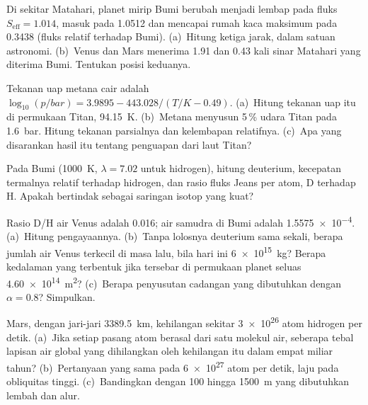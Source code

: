 \begin{exercise}[$\star$]\label{exo:b3:planetary-atmospheres:3}
Di sekitar Matahari, planet mirip Bumi berubah menjadi lembap pada fluks $S_\mathrm{eff}
= 1.014$, masuk  pada 1.0512 dan mencapai rumah kaca maksimum pada 0.3438
(fluks relatif terhadap Bumi). (a)~Hitung ketiga jarak, dalam
satuan astronomi. (b)~Venus dan Mars menerima 1.91 dan 0.43 kali
sinar Matahari yang diterima Bumi. Tentukan posisi keduanya.
\end{exercise}

\begin{exercise}[$\star$]\label{exo:b3:planetary-atmospheres:4}
Tekanan uap metana cair adalah $\log_{10}(p/\unit{bar}) = 3.9895 -
443.028/(T/\unit{K} - 0.49)$. (a)~Hitung tekanan uap itu di permukaan Titan,
\qty{94.15}{K}. (b)~Metana menyusun 5\,\% udara Titan pada \qty{1.6}{bar}.
Hitung tekanan parsialnya dan kelembapan relatifnya. (c)~Apa yang
disarankan hasil itu tentang penguapan dari laut Titan?
\end{exercise}

\begin{exercise}[$\star\star$]\label{exo:b3:planetary-atmospheres:5}
Pada  Bumi (\qty{1000}{K}, $\lambda = 7.02$ untuk hidrogen),
hitung  deuterium, kecepatan termalnya relatif terhadap
hidrogen, dan rasio fluks Jeans per atom, D terhadap H. Apakah 
bertindak sebagai saringan isotop yang kuat?
\end{exercise}

\begin{exercise}[$\star\star$]\label{exo:b3:planetary-atmospheres:6}
Rasio D/H air Venus adalah \num{0.016}; air samudra di
Bumi adalah \num{1.5575e-4}. (a)~Hitung pengayaannya. (b)~Tanpa
lolosnya deuterium sama sekali, berapa jumlah air Venus terkecil di masa lalu,
bila hari ini \qty{6e15}{kg}? Berapa kedalaman yang terbentuk jika tersebar di
permukaan planet seluas \qty{4.60e14}{m^2}? (c)~Berapa penyusutan cadangan
yang dibutuhkan  dengan $\alpha = 0.8$? Simpulkan.
\end{exercise}

\begin{exercise}[$\star\star$]\label{exo:b3:planetary-atmospheres:7}
Mars, dengan jari-jari \qty{3389.5}{km}, kehilangan sekitar \num{3e26} atom hidrogen
per detik. (a)~Jika setiap pasang atom berasal dari satu molekul air, seberapa
tebal lapisan air global yang dihilangkan oleh kehilangan itu dalam empat miliar tahun?
(b)~Pertanyaan yang sama pada \num{6e27} atom per detik, laju pada
obliquitas tinggi. (c)~Bandingkan dengan 100 hingga \qty{1500}{m} yang dibutuhkan
lembah dan alur.
\end{exercise}

